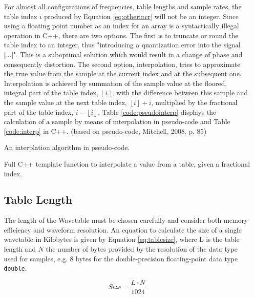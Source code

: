 For almost all configurations of frequencies, table lengths and sample rates, the table index $i$ produced by Equation \ref{eq:otherincr} will not be an integer. Since using a floating point number as an index for an array is a syntactically illegal operation in C++, there are two options. The first is to truncate or round the table index to an integer, thus "introducing a quantization error into the signal [...]".  This is a suboptimal solution which would result in a change of phase and consequently distortion.  The second option, interpolation, tries to approximate the true value from the sample at the current index and at the subsequent one. Interpolation is achieved by summation of the sample value at the floored, integral part of the table index, $\left \lfloor{i}\right \rfloor$, with the difference between this sample and the sample value at the next table index, $\left \lfloor {i}\right \rfloor + i$, multiplied by the fractional part of the table index, $i - \left \lfloor {i}\right \rfloor$. Table \ref{code:pseudointerp} displays the calculation of a sample by means of interpolation in pseudo-code and Table \ref{code:interp} in C++. (based on pseudo-code, Mitchell, 2008, p. 85)

\begin{table}
  \caption{An interplation algorithm in pseudo-code.}
  \label{code:pseudointerp}
\end{table}

\begin{table}
  \caption{Full C++ template function to interpolate a value from a table, given a fractional index. }
  \label{code:interp}
\end{table}

\subsection{Table Length}

The length of the Wavetable must be chosen carefully and consider both memory efficiency and waveform resolution. An equation to calculate the size of a single wavetable in Kilobytes is given by Equation \ref{eq:tablesize}, where L is the table length and $N$ the number of bytes provided by the resolution of the data type used for samples, e.g. 8 bytes for the double-precision floating-point data type \texttt{double}.

\begin{equation}
  Size = \frac{L \cdot N}{1024}
  \label{eq:tablesize}
\end{equation}

